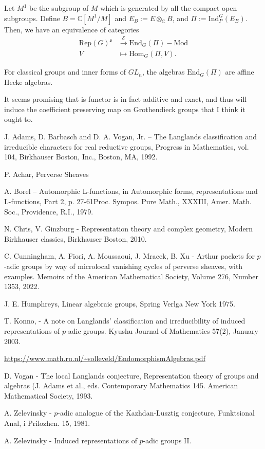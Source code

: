 \documentclass{memoir}
\newcommand{\mc}{\mathcal}
\newcommand{\mf}{\mathfrak}
\newcommand{\bc}{\mathbb{C}}
\newcommand{\tx}{\text}
\newcommand{\ten}{\otimes}
\theoremstyle{definition}
\begin{document}
		Let $M^1$ be the subgroup of $M$ which is generated by all the compact open subgroups.  
		Define $B=\bc[M^1/M]$ and $E_B:=E\ten_\bc B$, and $\Pi:=\tx{Ind}_P^G(E_B)$.  
		Then, we have an equivalence of categories
		\begin{align*}
			\tx{Rep}(G)^{\mf{s}}&\xrightarrow{\mc{E}}\tx{End}_G(\Pi)-\tx{Mod}\\
			V&\mapsto \tx{Hom}_G(\Pi, V).
		\end{align*}
	
	For classical groups and inner forms of $GL_n$, the algebras $\tx{End}_G(\Pi)$ are affine Hecke algebras.  
	
	It seems promising that is functor is in fact additive and exact, and thus will induce the coefficient preserving map on Grothendieck groups that I think it ought to. 
	
	
		\begin{thebibliography}{2}
		
		 J. Adams, D. Barbasch and D. A. Vogan, Jr. – The Langlands classification
		and irreducible characters for real reductive groups, Progress in Mathematics, vol. 104,
		Birkhauser Boston, Inc., Boston, MA, 1992.
		
		 P. Achar, Perverse Sheaves
		
		 A. Borel – Automorphic L-functions, in Automorphic forms, representations and
		L-functions, Part
		2, p. 27-61Proc. Sympos. Pure Math., XXXIII, Amer. Math. Soc., Providence, R.I., 1979. 
		
		 N. Chris, V. Ginzburg
		-
		Representation theory and complex geometry, Modern Birkhauser classics, Birkhauser Boston, 2010.
		
		 C. Cunningham, A. Fiori, A. Moussaoui, J. Mracek,  B. Xu - Arthur packets for $p$-adic groups by way of microlocal vanishing cycles of perverse sheaves, with examples. Memoirs of the American Mathematical Society, Volume 276, Number 1353, 2022.
		
		 J. E. Humphreys, Linear algebraic groups, Spring Verlga New York 1975.
		
		 T. Konno, - A note on Langlands’ classification and irreducibility of induced representations of $p$-adic groups. Kyushu Journal of Mathematics 57(2), January 2003. 
		
		 \url{https://www.math.ru.nl/~solleveld/EndomorphismAlgebras.pdf}
		
		 D. Vogan - The local Langlands conjecture, Representation theory of groups and algebras (J. Adams et al., eds. Contemporary Mathematics 145. American Mathematical Society, 1993.
		
		 A. Zelevinsky - $p$-adic analogue of the Kazhdan-Lusztig conjecture, Funktsional Anal, i Prilozhen.
		15, 1981.
		
		 A. Zelevinsky - Induced representations of $p$-adic groups II.  
	\end{thebibliography}
	
\end{document}
